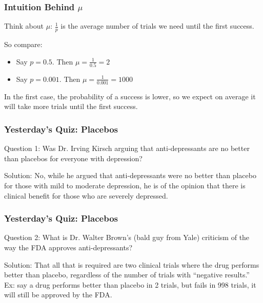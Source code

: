 \documentclass[handout]{beamer}
\newcommand{\blue}[1]{\textcolor{blue2}{#1}}
\begin{document}
\begin{frame}[fragile]
\frametitle{Intuition Behind $\mu$}

Think about $\mu$:  $\frac{1}{p}$ is the average number of trials we need until the \blue{first} success.

\vspace{0.5cm}

\pause So compare:
\begin{itemize}
\item Say $p=0.5$.  Then $\mu = \frac{1}{0.5} = 2$
\item Say $p=0.001$.  Then $\mu = \frac{1}{0.001} = 1000$
\end{itemize}

\vspace{0.5cm}

\pause In the first case, the probability of a success is \blue{lower}, so we expect on average it will take more trials until the \blue{first} success.  

\end{frame}


\begin{frame}[fragile]
\frametitle{Yesterday's Quiz: Placebos}

\blue{Question 1}: Was Dr. Irving Kirsch arguing that anti-depressants are no better than placebos for everyone with depression?

\vspace{0.5cm}

\pause\blue{Solution}: No, while he argued that anti-depressants were no better than placebo for those with mild to moderate depression, he is of the opinion that there is clinical benefit for those who are severely depressed.  


\end{frame}


\begin{frame}[fragile]
\frametitle{Yesterday's Quiz: Placebos}
\blue{Question 2}: What is Dr. Walter Brown's (bald guy from Yale) criticism of the way the FDA approves anti-depressants?

\vspace{0.5cm}

\pause\blue{Solution}:  That all that is required are two clinical trials where the drug performs better than placebo, regardless of the number of trials with ``negative results.''  Ex:  say a drug performs better than placebo in 2 trials, but fails in 998 trials, it will still be approved by the FDA.  

\end{frame}
\end{document}
